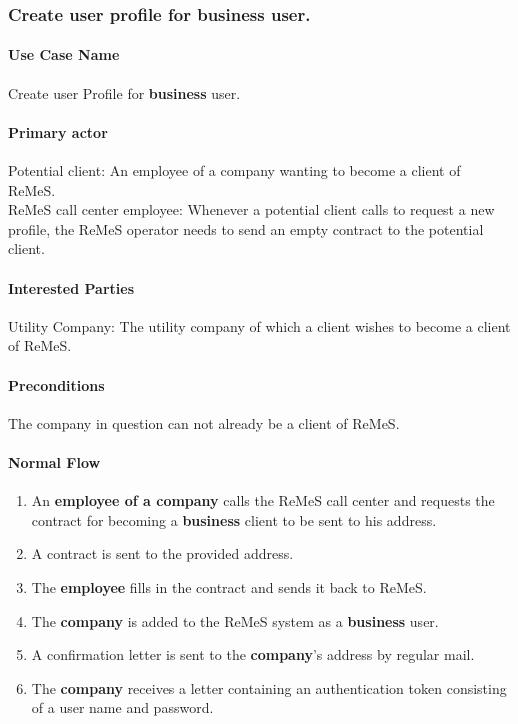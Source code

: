 \subsubsection{Create user profile for business user.}

\paragraph{Use Case Name}
Create user Profile for \textbf{business} user.
\paragraph{Primary actor}
Potential client: An employee of a company wanting to become a client of ReMeS. \\
ReMeS call center employee: Whenever a potential client calls to request a new profile, the ReMeS operator needs to send an empty contract to the potential client.
\paragraph{Interested Parties}
Utility Company: The utility company of which a client wishes to become a client of ReMeS.
\paragraph{Preconditions}
The company in question can not already be a client of ReMeS.
\paragraph{Normal Flow}
\begin{enumerate}
	\item An \textbf{employee of a company} calls the ReMeS call center and requests the contract for becoming a \textbf{business} client to be sent to his
	address.
	\item A contract is sent to the provided address.
	\item The \textbf{employee} fills in the contract and sends it back to ReMeS.
	\item The \textbf{company} is added to the ReMeS system as a \textbf{business} user.
	\item A confirmation letter is sent to the \textbf{company}'s address by regular mail. 
	\item The \textbf{company} receives a letter containing an authentication token consisting of a user name and password. 
\end{enumerate}

